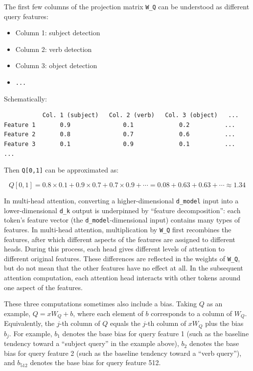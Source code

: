The first few columns of the projection matrix \texttt{W\_Q} can be understood as different query features:

\begin{itemize}
\tightlist
\item
  Column 1: subject detection
\item
  Column 2: verb detection
\item
  Column 3: object detection
\item
  \texttt{...}
\end{itemize}

Schematically:

\begin{verbatim}
           Col. 1 (subject)   Col. 2 (verb)   Col. 3 (object)   ...
Feature 1       0.9               0.1             0.2          ...
Feature 2       0.8               0.7             0.6          ...
Feature 3       0.1               0.9             0.1          ...
...
\end{verbatim}

Then \texttt{Q{[}0,1{]}} can be approximated as:

\[
Q[0,1] = 0.8 \times 0.1 + 0.9 \times 0.7 + 0.7 \times 0.9 + \cdots = 0.08 + 0.63 + 0.63 + \cdots \approx 1.34
\]

In multi-head attention, converting a higher-dimensional \texttt{d\_model} input into a lower-dimensional \texttt{d\_k} output is underpinned by ``feature decomposition'': each token's feature vector (the \texttt{d\_model}-dimensional input) contains many types of features. In multi-head attention, multiplication by \texttt{W\_Q} first recombines the features, after which different aspects of the features are assigned to different heads. During this process, each head gives different levels of attention to different original features. These differences are reflected in the weights of \texttt{W\_Q}, but do not mean that the other features have no effect at all. In the subsequent attention computation, each attention head interacts with other tokens around one aspect of the features.

These three computations sometimes also include a bias. Taking \(Q\) as an example, \(Q=xW_Q+b\), where each element of \(b\) corresponds to a column of \(W_Q\). Equivalently, the \(j\)-th column of \(Q\) equals the \(j\)-th column of \(xW_Q\) plus the bias \(b_j\). For example, \(b_1\) denotes the base bias for query feature 1 (such as the baseline tendency toward a ``subject query'' in the example above), \(b_2\) denotes the base bias for query feature 2 (such as the baseline tendency toward a ``verb query''), and \(b_{512}\) denotes the base bias for query feature 512.

